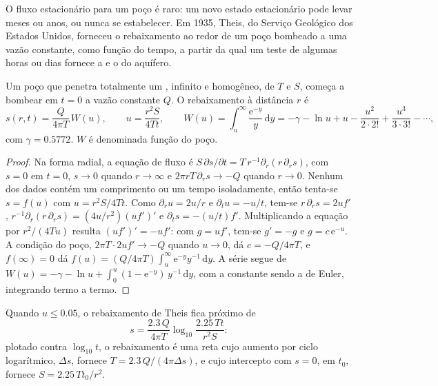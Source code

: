 O fluxo estacionário para um poço é raro: um novo estado estacionário pode levar meses ou
anos, ou nunca se estabelecer. Em 1935, Theis, do Serviço Geológico
dos Estados Unidos, forneceu o rebaixamento ao redor de um poço bombeado a uma vazão constante, como
função do tempo, a partir da qual um teste de algumas horas ou dias fornece a
 e o  do aquífero.

\begin{theorem}\label{thm:b3:hydrogeology:theis}
Um poço que penetra totalmente um , infinito e homogêneo, de
 $T$ e  $S$, começa a bombear em $t = 0$ a
vazão constante $Q$. O rebaixamento à distância $r$ é
\[
s(r, t) = \frac{Q}{4\pi T}\,W(u), \qquad u = \frac{r^2S}{4Tt}, \qquad
W(u) = \int_u^\infty\frac{\mathrm e^{-y}}{y}\,\mathrm dy = -\gamma - \ln u +
u - \frac{u^2}{2\cdot2!} + \frac{u^3}{3\cdot3!} - \cdots,
\]
com $\gamma = \num{0.5772}$. $W$ é denominada função do poço.
\end{theorem}

\begin{proof}
Na forma radial, a equação de fluxo é $S\,\partial s/\partial t =
T\,r^{-1}\partial_r(r\,\partial_rs)$, com $s = 0$ em $t = 0$, $s \to 0$ quando
$r \to \infty$ e $2\pi rT\,\partial_rs \to -Q$ quando $r \to 0$. Nenhum dos
dados contém um comprimento ou um tempo isoladamente, então tenta-se $s = f(u)$ com $u =
r^2S/4Tt$. Como $\partial_ru = 2u/r$ e $\partial_tu = -u/t$, tem-se $r\,\partial_rs =
2uf'$, $r^{-1}\partial_r(r\,\partial_rs) = (4u/r^2)(uf')'$ e $\partial_ts =
-(u/t)f'$. Multiplicando a equação por $r^2/(4Tu)$ resulta $(uf')' = -uf'$:
com $g = uf'$, tem-se $g' = -g$ e $g = c\,\mathrm e^{-u}$. A condição do poço, $2\pi T\cdot2uf' \to -Q$ quando $u \to 0$, dá $c =
-Q/4\pi T$, e $f(\infty) = 0$ dá $f(u) = (Q/4\pi T)\int_u^\infty
\mathrm e^{-y}y^{-1}\,\mathrm dy$. A série segue de
$W(u) = -\gamma - \ln u + \int_0^u(1 - \mathrm e^{-y})\,y^{-1}\,\mathrm dy$,
com a constante sendo a de Euler, integrando termo a termo.
\end{proof}

\begin{proposition}\label{prop:b3:hydrogeology:cooper-jacob}
Quando $u \le 0.05$, o rebaixamento de Theis fica próximo de
\[
s = \frac{2.3\,Q}{4\pi T}\log_{10}\frac{2.25\,Tt}{r^2S} :
\]
plotado contra $\log_{10}t$, o rebaixamento é uma reta cujo aumento por
ciclo logarítmico, $\Delta s$, fornece $T = 2.3\,Q/(4\pi\Delta s)$, e cujo
intercepto com $s = 0$, em $t_0$, fornece $S = 2.25\,Tt_0/r^2$.
\end{proposition}

